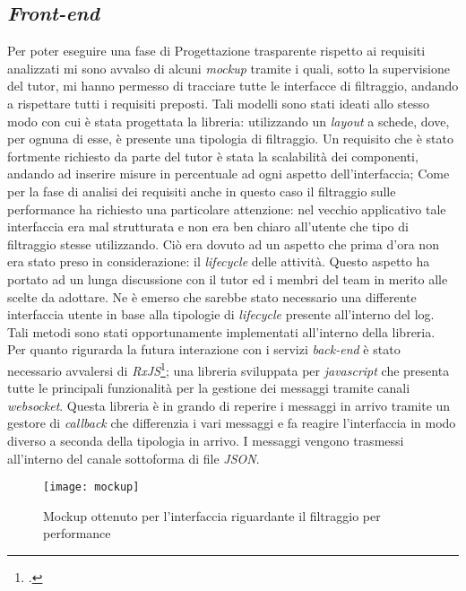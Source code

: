 \subsection{\textit{Front-end}}
Per poter eseguire una fase di Progettazione trasparente rispetto ai requisiti analizzati mi sono avvalso di alcuni \textit{\gls{mockup}} tramite i quali, sotto la supervisione del tutor, mi hanno permesso di tracciare tutte le interfacce di filtraggio, andando a rispettare tutti i requisiti preposti. Tali modelli sono stati ideati allo stesso modo con cui è stata progettata la libreria: utilizzando un \textit{layout} a schede, dove, per ognuna di esse, è presente una tipologia di filtraggio. Un requisito che è stato fortmente richiesto da parte del tutor è stata la scalabilità dei componenti, andando ad inserire misure in percentuale ad ogni aspetto dell'interfaccia; Come per la fase di analisi dei requisiti anche in questo caso il filtraggio sulle performance ha richiesto una particolare attenzione: nel vecchio applicativo tale interfaccia era mal strutturata e non era ben chiaro all'utente che tipo di filtraggio stesse utilizzando. Ciò era dovuto ad un aspetto che prima d'ora non era stato preso in considerazione: il \textit{lifecycle} delle attività. Questo aspetto ha portato ad un lunga discussione con il tutor ed i membri del team in merito alle scelte da adottare. Ne è emerso che sarebbe stato necessario una differente interfaccia utente in base alla tipologie di \textit{lifecycle} presente all'interno del log. Tali metodi sono stati opportunamente implementati all'interno della libreria.\\
Per quanto rigurarda la futura interazione con i servizi \textit{back-end} è stato necessario avvalersi di \textit{RxJS}\footcite{RxJS: https://rxjs-dev.firebaseapp.com/}; una libreria sviluppata per \textit{javascript} che presenta tutte le principali funzionalità per la gestione dei messaggi tramite canali \textit{websocket}. Questa libreria è in grando di reperire i messaggi in arrivo tramite un gestore di \textit{callback} che differenzia i vari messaggi e fa reagire l'interfaccia in modo diverso a seconda della tipologia in arrivo. I messaggi vengono trasmessi all'interno del canale sottoforma di file \textit{\gls{JSON}}.
\begin{figure}[!h] 
	\centering 
	\texttt{[image: mockup]} 
	\caption{Mockup ottenuto per l'interfaccia riguardante il filtraggio per performance}
\end{figure}
